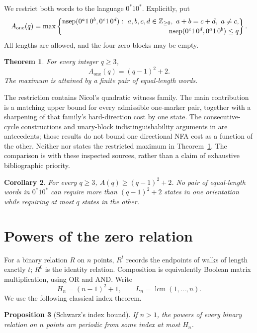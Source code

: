 \documentclass[11pt,a4paper]{article}
\newtheorem{theorem}{Theorem}
\newtheorem{proposition}[theorem]{Proposition}
\newtheorem{corollary}[theorem]{Corollary}
\DeclareMathOperator{\nsep}{nsep}
\DeclareMathOperator{\lcm}{lcm}
\newcommand{\Aone}{A_{\mathrm{one}}}
\newcommand{\Nzero}{\mathbb Z_{\geq 0}}
\begin{document}
We restrict both words to the language \(0^*10^*\). Explicitly, put
\[
 \Aone(q)=\max\left\{
 \begin{array}{@{}l@{}}
 \nsep(0^a1\,0^b,0^c1\,0^d):\
 a,b,c,d\in\Nzero,\ a+b=c+d,\ a\ne c,\\[2pt]
 \hfill \nsep(0^c1\,0^d,0^a1\,0^b)\leq q
 \end{array}\right\}.
\]
All lengths are allowed, and the four zero blocks may be empty.

\begin{theorem}\label{thm:main}
For every integer \(q\geq3\),
\[
 \Aone(q)=(q-1)^2+2.
\]
The maximum is attained by a finite pair of equal-length words.
\end{theorem}

The restriction contains Nicol's quadratic witness family. The main
contribution is a matching upper bound for every admissible one-marker
pair, together with a sharpening of that family's hard-direction cost
by one state. The consecutive-cycle constructions and unary-block
indistinguishability arguments in
\cite[Theorems~3--4]{demaine2011} are antecedents; those results do not
bound one directional NFA cost as a function of the other.
Neither \cite{demaine2011} nor \cite{nicol2026} states the restricted
maximum in Theorem~\ref{thm:main}. The comparison is with these inspected
sources, rather than a claim of exhaustive bibliographic priority.

\begin{corollary}\label{cor:general}
For every \(q\geq3\), \(A(q)\geq(q-1)^2+2\).
No pair of equal-length words in \(0^*10^*\) can require more than
\((q-1)^2+2\) states in one orientation while requiring at most \(q\)
states in the other.
\end{corollary}

\section{Powers of the zero relation}

For a binary relation \(R\) on \(n\) points, \(R^t\) records the endpoints
of walks of length exactly \(t\); \(R^0\) is the identity relation.
Composition is equivalently Boolean matrix multiplication, using OR and
AND. Write
\[
 H_n=(n-1)^2+1,\qquad L_n=\lcm(1,\ldots,n).
\]
We use the following classical index theorem.

\begin{proposition}[Schwarz's index bound]\label{prop:schwarz}
If \(n>1\), the powers of every binary relation on \(n\) points are
periodic from some index at most \(H_n\).
\end{proposition}
\end{document}
